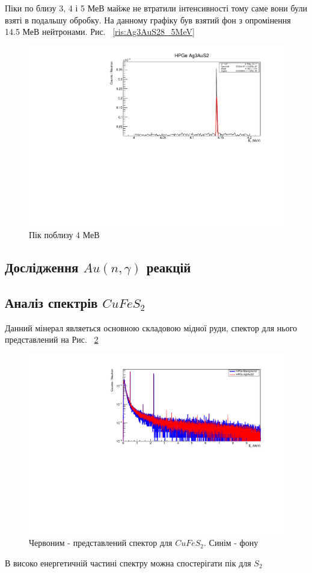\documentclass[a4paper, 14pt]{article}
\numberwithin{equation}{section}
\numberwithin{table}{section}
\begin{document}
	Піки по близу 3, 4 і 5 МеВ майже не втратили інтенсивності тому саме вони були взяті в подальшу обробку. На данному графіку був взятий фон з опромінення 14.5 МеВ нейтронами. Рис. ~\ref{ris:Ag3AuS28_5MeV}	
	\begin{figure}[hbt!]
		\centering \includegraphics[width=1\textwidth]{res/fit/Ag3AuS24143.pdf}
		\caption{Пік поблизу 4 МеВ}
		\label{ris:Ag3AuS24143}	
	\end{figure} 
\subsection{Дослідження $Au(n, \gamma)$ реакцій} 

\subsection{Аналіз спектрів $CuFeS_2$}
	Данний мінерал являеться основною складовою мідної руди, спектор для нього представлений на Рис. ~\ref{ris:CuFeS_2Fon}
	\begin{figure}[hbt!]
		\centering \includegraphics[width=1\textwidth]{res/smCuFeS2FonAll.pdf}
		\caption{Червоним - представлений спектор для $CuFeS_2$. Синім - фону} 
		\label{ris:CuFeS_2Fon}	
	\end{figure} 	
	В високо енергетичній частині спектру можна спостерігати пік для $S_2$
		
\end{document}
